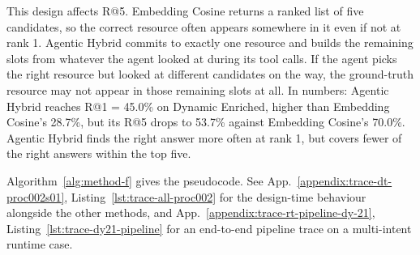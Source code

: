 This design affects R@5. Embedding Cosine returns a ranked list of five candidates, so the correct resource often appears somewhere in it even if not at rank 1. Agentic Hybrid commits to exactly one resource and builds the remaining slots from whatever the agent looked at during its tool calls. If the agent picks the right resource but looked at different candidates on the way, the ground-truth resource may not appear in those remaining slots at all. In numbers: Agentic Hybrid reaches R@1 = 45.0\% on Dynamic Enriched, higher than Embedding Cosine's 28.7\%, but its R@5 drops to 53.7\% against Embedding Cosine's 70.0\%. Agentic Hybrid finds the right answer more often at rank 1, but covers fewer of the right answers within the top five.

Algorithm~\ref{alg:method-f} gives the pseudocode. See App.~\ref{appendix:trace-dt-proc002s01}, Listing~\ref{lst:trace-all-proc002} for the design-time behaviour alongside the other methods, and App.~\ref{appendix:trace-rt-pipeline-dy-21}, Listing~\ref{lst:trace-dy21-pipeline} for an end-to-end pipeline trace on a multi-intent runtime case.





